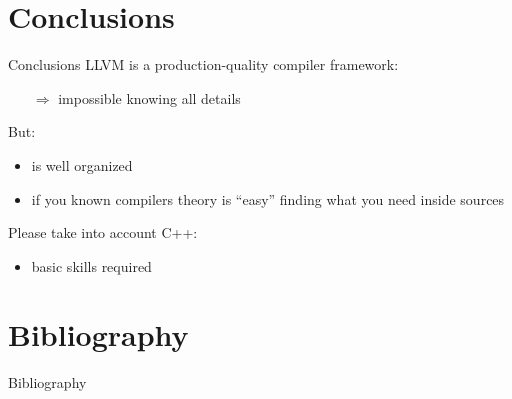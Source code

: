 \documentclass[10pt,mathserif]{beamer}
\begin{document}
\section{Conclusions}
\begin{frame}{Conclusions}
LLVM is a \alert{production-quality} compiler framework:

\begin{itemize}
\item[$\Rightarrow$] impossible knowing all details
\end{itemize}

\vfill
But:

\begin{itemize}
\item is well organized
\item if you known compilers theory is ``easy'' finding what you need inside sources
\end{itemize}

\vfill
Please take into account C++:
\begin{itemize}
\item basic skills required
\end{itemize}
\end{frame}

\section{Bibliography}
\begin{frame}[allowframebreaks]{Bibliography}
\nocite{*}


\end{frame}
\end{document}
